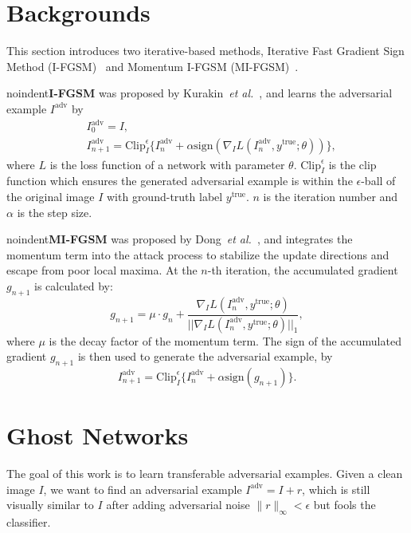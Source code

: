 \documentclass[letterpaper]{article} %
\def\etal{\emph{et al.}}
\begin{document}
\section{Backgrounds} \label{sec:related work}
This section introduces two iterative-based methods, Iterative Fast Gradient Sign Method (I-FGSM)~\cite{kurakin2016adversarial} and Momentum I-FGSM (MI-FGSM)~\cite{dong2017boosting}.



noindent\textbf{I-FGSM} was proposed by Kurakin~\etal~\cite{kurakin2016adversarial}, and learns the adversarial example $I^{\text{adv}}$ by%
\begin{equation} \label{eq:IFGSM update}
\begin{split}
&I_{0}^{\text{adv}} = I, \\
&I_{n+1}^{\text{adv}} = \text{Clip}_{I}^{\epsilon} \{I_{n}^{\text{adv}} + \alpha\text{sign}\left(\nabla_{I} L(I_{n}^{\text{adv}}, y^{\text{true}}; \theta)\right)\},
\end{split}
\end{equation}
where $L$ is the loss function of a network with parameter $\theta$. $\text{Clip}_{I}^{\epsilon}$ is the clip function which ensures the generated adversarial example is within the $\epsilon$-ball of the original image $I$ with ground-truth label $y^{\text{true}}$. $n$ is the iteration number and $\alpha$ is the step size.

noindent\textbf{MI-FGSM} was proposed by Dong~\etal~\cite{dong2017boosting}, and integrates the momentum term into the attack process to stabilize the update directions and escape from poor local maxima. At the $n$-th iteration, the accumulated gradient $g_{n+1}$ is calculated by:%
\begin{equation} \label{eq: momentum term}
g_{n+1} = \mu \cdot g_n + \frac{\nabla_{I} L(I_{n}^{\text{adv}}, y^{\text{true}}; \theta)}{||\nabla_{I} L(I_{n}^{\text{adv}}, y^{\text{true}}; \theta)||_1},
\end{equation}
where $\mu$ is the decay factor of the momentum term. The sign of the accumulated gradient $g_{n+1}$ is then used to generate the adversarial example, by
\begin{equation}
I_{n+1}^{\text{adv}} = \text{Clip}_{I}^{\epsilon}\{I_{n}^{\text{adv}} + \alpha\text{sign}(g_{n+1})\}.
\end{equation}

\section{Ghost Networks} \label{sec:method}
The goal of this work is to learn transferable adversarial examples. Given a clean image $I$, we want to find an adversarial example $I^\text{adv}=I+r$, which is still visually similar to $I$ after adding adversarial noise $\|r\|_\infty<\epsilon$ but fools the classifier. %
\end{document}
